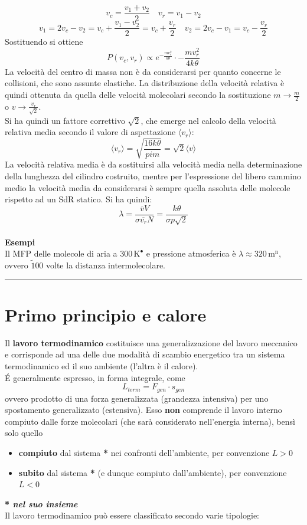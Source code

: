 \documentclass[10pt, oneside]{book}
\newcommand{\kelvin}[1]{\, \mathrm{K^{#1}}}
\newcommand{\meters}[2]{\, \mathrm{#2 m^{#1}}}
\newcommand{\mean}[1]{\langle #1 \rangle}
\newcommand{\infobox}[2]{\vspace{0.5cm}~\\ \textbf{#1} \hrulefill \vspace{0.2cm}\\#2 \\\hrule \vspace{0.5cm}}
\newcommand{\ds}{\displaystyle}
\begin{document}
\[v_c = \frac{v_1 + v_2}{2} \quad v_r = v_1 - v_2\]
\[v_1 = 2 v_c - v_2 = v_c + \frac{v_1 - v_2}{2}= v_c + \frac{v_r}{2} \quad v_2 = 2 v_c - v_1 = v_c - \frac{v_r}{2}\]
Sostituendo si ottiene
\[P(v_c, v_r) \propto e^{\displaystyle - \frac{m v_c^2}{k \theta}} \cdot \displaystyle - \frac{m v_r^2}{4k \theta}\]
La velocità del centro di massa non è da considerarsi per quanto concerne le collisioni, che sono assunte elastiche. La distribuzione della velocità relativa è quindi ottenuta da quella delle velocità molecolari secondo la sostituzione $\ds m \rightarrow \frac{m}{2}$ o $\ds v \rightarrow \frac{v_r}{\sqrt{2}}$.\\
Si ha quindi un fattore correttivo $\ds \sqrt{2}$, che emerge nel calcolo della velocità relativa media secondo il valore di aspettazione $\mean{v_r}$:
\[\mean{v_r} = \sqrt{\frac{16 k \theta}{pi m}}= \sqrt{2} \mean{v}\]
La velocità relativa media è da sostituirsi alla velocità media nella determinazione della lunghezza del cilindro costruito, mentre per l'espressione del libero cammino medio la velocità media da considerarsi è sempre quella assoluta delle molecole rispetto ad un SdR statico. Si ha quindi:
\[\lambda = \frac{\overline{v} V}{\sigma \overline{v_r} N} = \frac{k \theta}{\sigma p \sqrt{2}}\]
\infobox{Esempi}{Il MFP delle molecole di aria a $300 \kelvin{•}$ e pressione atmosferica è $\lambda \approx 320 \meters{n}{}$, ovvero $\tilde 100$ volte la distanza intermolecolare.}

\chapter{Primo principio e calore}
Il \textbf{lavoro termodinamico} costituisce una generalizzazione del lavoro meccanico e corrisponde ad una delle due modalità di scambio energetico tra un sistema termodinamico ed il suo ambiente (l'altra è il calore).\\
\'E generalmente espresso, in forma integrale, come
\[L_{term} = F_{gen} \cdot s_{gen}\]
ovvero prodotto di una forza generalizzata (grandezza intensiva) per uno spostamento generalizzato (estensiva). Esso \textbf{non} comprende il lavoro interno compiuto dalle forze molecolari (che sarà considerato nell'energia interna), bensì solo quello
\begin{itemize}
\item \textbf{compiuto} dal sistema \textbf{*} nei confronti dell'ambiente, per convenzione $L > 0$
\item \textbf{subito} dal sistema \textbf{*} (e dunque compiuto dall'ambiente), per convenzione $L < 0$ 
\end{itemize}
\textbf{* \textit{nel suo insieme}}\\
Il lavoro termodinamico può essere classificato secondo varie tipologie:
\end{document}
